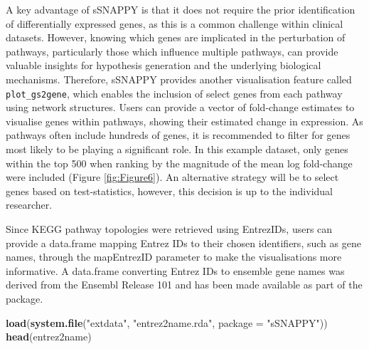 \documentclass[9pt,a4paper,]{extarticle}
\newenvironment{Shaded}{\begin{snugshade}}{\end{snugshade}}
\newcommand{\AttributeTok}[1]{\textcolor[rgb]{0.13,0.29,0.53}{#1}}
\newcommand{\DecValTok}[1]{\textcolor[rgb]{0.00,0.00,0.81}{#1}}
\newcommand{\FunctionTok}[1]{\textcolor[rgb]{0.13,0.29,0.53}{\textbf{#1}}}
\newcommand{\NormalTok}[1]{#1}
\newcommand{\OtherTok}[1]{\textcolor[rgb]{0.56,0.35,0.01}{#1}}
\newcommand{\SpecialCharTok}[1]{\textcolor[rgb]{0.81,0.36,0.00}{\textbf{#1}}}
\newcommand{\StringTok}[1]{\textcolor[rgb]{0.31,0.60,0.02}{#1}}
\begin{document}
A key advantage of sSNAPPY is that it does not require the prior identification of differentially expressed genes, as this is a common challenge within clinical datasets.
However, knowing which genes are implicated in the perturbation of pathways, particularly those which influence multiple pathways, can provide valuable insights for hypothesis generation and the underlying biological mechanisms.
Therefore, sSNAPPY provides another visualisation feature called \texttt{plot\_gs2gene}, which enables the inclusion of select genes from each pathway using network structures.
Users can provide a vector of fold-change estimates to visualise genes within pathways, showing their estimated change in expression.
As pathways often include hundreds of genes, it is recommended to filter for genes most likely to be playing a significant role.
In this example dataset, only genes within the top 500 when ranking by the magnitude of the mean log fold-change were included (Figure \ref{fig:Figure6}).
An alternative strategy will be to select genes based on test-statistics, however, this decision is up to the individual researcher.

\begin{Shaded}
\end{Shaded}

Since KEGG pathway topologies were retrieved using EntrezIDs, users can provide a data.frame mapping Entrez IDs to their chosen identifiers, such as gene names, through the mapEntrezID parameter to make the visualisations more informative.
A data.frame converting Entrez IDs to ensemble gene names was derived from the Ensembl Release 101\citep{Ensembl2022} and has been made available as part of the package.

\begin{Shaded}
\begin{Highlighting}[]
\FunctionTok{load}\NormalTok{(}\FunctionTok{system.file}\NormalTok{(}\StringTok{"extdata"}\NormalTok{, }\StringTok{"entrez2name.rda"}\NormalTok{, }\AttributeTok{package =} \StringTok{"sSNAPPY"}\NormalTok{))}
\FunctionTok{head}\NormalTok{(entrez2name)}
\end{Highlighting}
\end{Shaded}
\end{document}
